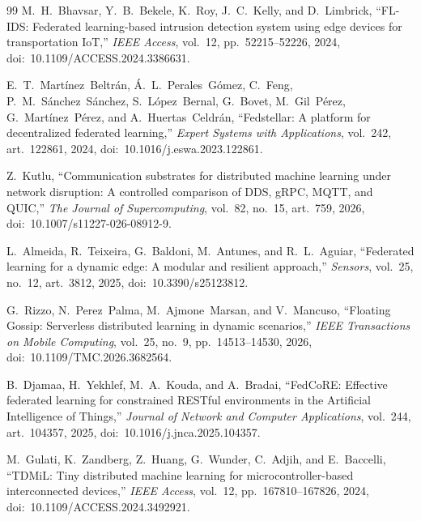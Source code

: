 \documentclass[a4paper,fleqn]{cas-dc}
\begin{document}
\begin{thebibliography}{99}
M.~H.~Bhavsar, Y.~B.~Bekele, K.~Roy, J.~C.~Kelly, and D.~Limbrick,
``FL-IDS: Federated learning-based intrusion detection system using edge devices for transportation IoT,''
\emph{IEEE Access}, vol.~12, pp.~52215--52226, 2024, doi:~10.1109/ACCESS.2024.3386631.

E.~T.~Mart\'{i}nez~Beltr\'{a}n, \'{A}.~L.~Perales~G\'{o}mez, C.~Feng, P.~M.~S\'{a}nchez~S\'{a}nchez, S.~L\'{o}pez~Bernal, G.~Bovet, M.~Gil~P\'{e}rez, G.~Mart\'{i}nez~P\'{e}rez, and A.~Huertas~Celdr\'{a}n,
``Fedstellar: A platform for decentralized federated learning,''
\emph{Expert Systems with Applications}, vol.~242, art.~122861, 2024, doi:~10.1016/j.eswa.2023.122861.

Z.~Kutlu,
``Communication substrates for distributed machine learning under network disruption: A controlled comparison of DDS, gRPC, MQTT, and QUIC,''
\emph{The Journal of Supercomputing}, vol.~82, no.~15, art.~759, 2026, doi:~10.1007/s11227-026-08912-9.

L.~Almeida, R.~Teixeira, G.~Baldoni, M.~Antunes, and R.~L.~Aguiar,
``Federated learning for a dynamic edge: A modular and resilient approach,''
\emph{Sensors}, vol.~25, no.~12, art.~3812, 2025, doi:~10.3390/s25123812.

G.~Rizzo, N.~Perez~Palma, M.~Ajmone~Marsan, and V.~Mancuso,
``Floating Gossip: Serverless distributed learning in dynamic scenarios,''
\emph{IEEE Transactions on Mobile Computing}, vol.~25, no.~9, pp.~14513--14530, 2026, doi:~10.1109/TMC.2026.3682564.

B.~Djamaa, H.~Yekhlef, M.~A.~Kouda, and A.~Bradai,
``FedCoRE: Effective federated learning for constrained RESTful environments in the Artificial Intelligence of Things,''
\emph{Journal of Network and Computer Applications}, vol.~244, art.~104357, 2025, doi:~10.1016/j.jnca.2025.104357.

M.~Gulati, K.~Zandberg, Z.~Huang, G.~Wunder, C.~Adjih, and E.~Baccelli,
``TDMiL: Tiny distributed machine learning for microcontroller-based interconnected devices,''
\emph{IEEE Access}, vol.~12, pp.~167810--167826, 2024, doi:~10.1109/ACCESS.2024.3492921.

\end{thebibliography}
\end{document}

